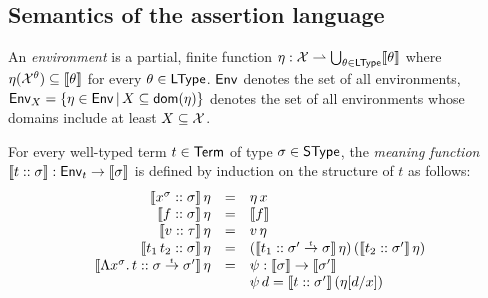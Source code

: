 \documentclass[12pt,a4paper]{report}
\newcommand{\senv}{\nstyle{env}}
\begin{document}

\subsection{Semantics of the assertion language}

\begin{definition}[Model]
  An {\em environment} is a partial, finite function $\eta: \mathcal{X} \rightharpoonup \bigcup_{\theta\in\mathsf{LType}} \llbracket\theta\rrbracket$
  where $\eta(\mathcal{X}^\theta) \subseteq \llbracket\theta\rrbracket$ for every $\theta \in \mathsf{LType}$. $\mathsf{Env}$ denotes
  the set of all environments, $\mathsf{Env}_X = \{\eta\in\mathsf{Env}\,|\,X \subseteq \mathsf{dom}(\eta)\}$ denotes the set of
  all environments whose domains include at least $X \subseteq \mathcal{X}$.
\end{definition}


\begin{definition}
  For every well-typed term $t \in \mathsf{Term}$ of type $\sigma \in \mathsf{SType}$, the {\em meaning function}
  $\llbracket{t}\mathrel{::}{\sigma}\rrbracket: \mathsf{Env}_t \to \llbracket\sigma\rrbracket$ is defined by induction on the structure of $t$ as
  follows:
  \[\begin{array}{rcl}
    \llbracket{x^\sigma}\mathrel{::}{\sigma}\rrbracket\,\eta
      &=& \eta\,x \\
    \llbracket{f}\mathrel{::}{\sigma}\rrbracket\,\eta 
      &=& \llbracket f\rrbracket \\
    \llbracket{v}\mathrel{::}{\tau}\rrbracket\,\eta
      &=& v\,\eta \\
    \llbracket{t_1\,t_2}\mathrel{::}{\sigma}\rrbracket\,\eta
      &=& (\llbracket{t_1}\mathrel{::}{\sigma'\stackrel{_t}{\to}\sigma}\rrbracket\,\eta)\,
          (\llbracket{t_2}\mathrel{::}{\sigma'}\rrbracket\,\eta) \\
    \llbracket{\Lambda x^\sigma.\,t}\mathrel{::}{\sigma\stackrel{_t}{\to}\sigma'}\rrbracket\,\eta
      &=& \psi: \llbracket\sigma\rrbracket \to \llbracket\sigma'\rrbracket \\
      & & \psi\, d = \llbracket{t}\mathrel{::}{\sigma'}\rrbracket\,(\eta[d/x])
  \end{array}\]
\end{definition}
\end{document}
